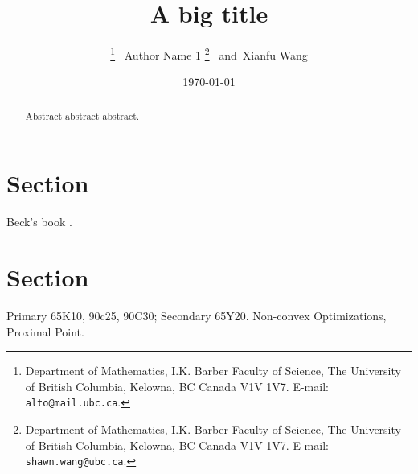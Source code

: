 \documentclass[12pt]{article}
\begin{document}
\title{
    {
        \selectfont 
        A big title
    }
    }

\author{
    \thanks{Department of Mathematics, I.K. Barber Faculty of Science,
    The University of British Columbia, Kelowna, BC Canada V1V 1V7. 
    E-mail:  \texttt{alto@mail.ubc.ca}.}~ Author Name 1
    \thanks{Department of Mathematics, I.K. Barber Faculty of Science,
    The University of British Columbia, Kelowna, BC Canada V1V 1V7. 
    E-mail:  \texttt{shawn.wang@ubc.ca}.}~ and~Xianfu Wang
}

\date{\today}

\maketitle


\section{Section}
    Beck's book \cite{beck_first-order_2017}. 
\section{Section}
    


\begin{abstract} 
    \noindent
    Abstract abstract abstract. 
    
\end{abstract}

Primary 65K10, 90c25, 90C30; Secondary 65Y20. 
 Non-convex Optimizations, Proximal Point. 




\newpage

\appendix
\end{document}
